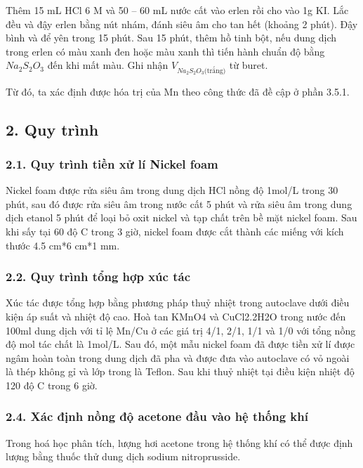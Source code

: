 \documentclass{article} %
\begin{document}
Thêm 15 mL HCl 6 M và 50 -- 60 mL nước cất vào erlen rồi cho vào 1g KI. Lắc đều và đậy erlen bằng nút nhám, đánh siêu âm cho tan hết (khoảng 2 phút). Đậy bình và để yên trong 15 phút. Sau 15 phút, thêm hồ tinh bột, nếu dung dịch trong erlen có màu xanh đen hoặc màu xanh thì tiến hành chuẩn độ bằng $Na_2S_2O_3$ đến khi mất màu. Ghi nhận $V_{Na_2S_2O_3 \text{(trắng)}}$ từ buret.

Từ đó, ta xác định được hóa trị của Mn theo công thức đã đề cập ở phần 3.5.1.


\subsection*{2. Quy trình}
 {}
\setcounter{section}{2}
\setcounter{figure}{0}
\setcounter{table}{0}

\subsubsection*{2.1. Quy trình tiền xử lí Nickel foam}
 {}

Nickel foam được rửa siêu âm trong dung dịch HCl nồng độ 1mol/L trong 30 phút, sau đó được rửa siêu âm trong nước cất 5 phút và rửa siêu âm trong dung dịch etanol 5 phút để loại bỏ oxit nickel và tạp chất trên bề mặt nickel foam. Sau khi sấy tại 60 độ C trong 3 giờ, nickel foam được cắt thành các miếng với kích thước 4.5 cm*6 cm*1 mm.

\subsubsection*{2.2. Quy trình tổng hợp xúc tác}
 {}

Xúc tác được tổng hợp bằng phương pháp thuỷ nhiệt trong autoclave dưới điều kiện áp suất và nhiệt độ cao. Hoà tan KMnO4 và CuCl2.2H2O trong nước đến 100ml dung dịch với tỉ lệ Mn/Cu ở các giá trị 4/1, 2/1, 1/1 và 1/0 với tổng nồng độ mol tác chất là 1mol/L. Sau đó, một mẫu nickel foam đã được tiền xử lí được ngâm hoàn toàn trong dung dịch đã pha và được đưa vào autoclave có vỏ ngoài là thép không gỉ và lớp trong là Teflon. Sau khi thuỷ nhiệt tại điều kiện nhiệt độ 120 độ C trong 6 giờ.

\subsubsection*{2.4. Xác định nồng độ acetone đầu vào hệ thống khí}
 {}
Trong hoá học phân tích, lượng hơi acetone trong hệ thống khí có thể được định lượng bằng thuốc thử dung dịch sodium nitroprusside.
\end{document}
